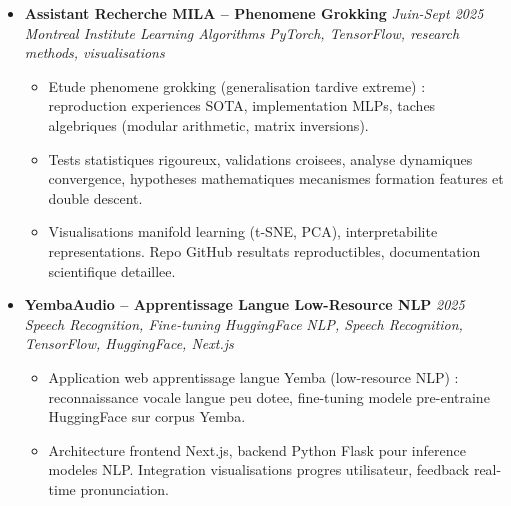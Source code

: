 \documentclass[a4paper,11pt]{article}
\begin{document}
\begin{itemize}[leftmargin=*, label={-}]
\item \textbf{Assistant Recherche MILA -- Phenomene Grokking} \hfill \textit{Juin-Sept 2025} \\
\textit{Montreal Institute Learning Algorithms} \hfill \textit{PyTorch, TensorFlow, research methods, visualisations}
\vspace{-2pt}
    \begin{itemize}[leftmargin=0.4cm, nosep, label=\tiny$\bullet$]
        \item \small{Etude phenomene grokking (generalisation tardive extreme) : reproduction experiences SOTA, implementation MLPs, taches algebriques (modular arithmetic, matrix inversions).}
        \item \small{Tests statistiques rigoureux, validations croisees, analyse dynamiques convergence, hypotheses mathematiques mecanismes formation features et double descent.}
        \item \small{Visualisations manifold learning (t-SNE, PCA), interpretabilite representations. Repo GitHub resultats reproductibles, documentation scientifique detaillee.}
    \end{itemize}
\vspace{3pt}

\item \textbf{YembaAudio -- Apprentissage Langue Low-Resource NLP} \hfill \textit{2025} \\
\textit{Speech Recognition, Fine-tuning HuggingFace} \hfill \textit{NLP, Speech Recognition, TensorFlow, HuggingFace, Next.js}
\vspace{-2pt}
    \begin{itemize}[leftmargin=0.4cm, nosep, label=\tiny$\bullet$]
        \item \small{Application web apprentissage langue Yemba (low-resource NLP) : reconnaissance vocale langue peu dotee, fine-tuning modele pre-entraine HuggingFace sur corpus Yemba.}
        \item \small{Architecture frontend Next.js, backend Python Flask pour inference modeles NLP. Integration visualisations progres utilisateur, feedback real-time pronunciation.}
    \end{itemize}
\vspace{3pt}


\end{itemize}
\end{document}
